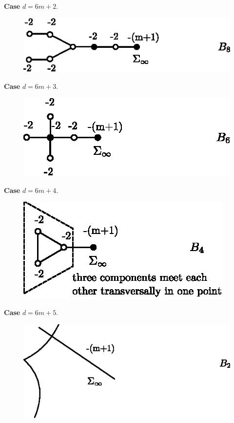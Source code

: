 \noindent
{\bf Case} $d=6m+2$.
\begin{figure}[H]
\centering
\includegraphics{figures/miyansi_fig18.eps}
\end{figure}

\noindent
{\bf Case} $d=6m+3$.
\begin{figure}[H]
\centering
\includegraphics{figures/miyansi_fig19.eps}
\end{figure}

\noindent
{\bf Case} $d=6m+4$.\pageoriginale\
\begin{figure}[H]
\centering
\includegraphics{figures/miyansi_fig20.eps}
\end{figure}

\noindent
{\bf Case} $d=6m+5$.
\begin{figure}[H]
\centering
\includegraphics{figures/miyansi_fig21.eps}
\end{figure}

